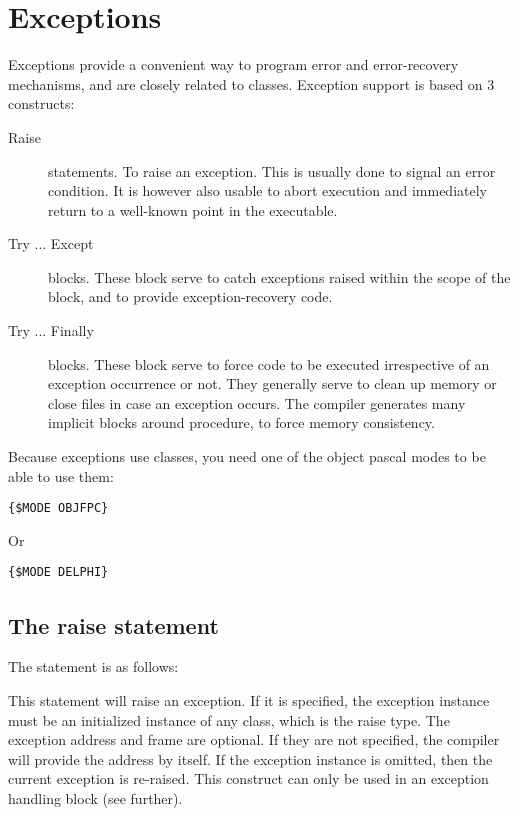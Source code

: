 \chapter{Exceptions}
\label{ch:Exceptions}
Exceptions provide a convenient way to program error and error-recovery
mechanisms, and are closely related to classes.
Exception support is based on 3 constructs:
\begin{description}
\item [Raise\ ] statements. To raise an exception. This is usually done to signal an
error condition. It is however also usable to
abort execution and immediately return to a well-known point in the
executable.
\item [Try ... Except\ ] blocks. These block serve to catch exceptions
raised within the scope of the block, and to provide exception-recovery
code.
\item [Try ... Finally\ ] blocks. These block serve to force code to be
executed irrespective of an exception occurrence or not. They generally
serve to clean up memory or close files in case an exception occurs.
The compiler generates many implicit  blocks around
procedure, to force memory consistency.
\end{description}

\begin{remark}
Because exceptions use classes, you need one of the object pascal modes to
be able to use them:
\begin{verbatim}
{$MODE OBJFPC}
\end{verbatim}
Or
\begin{verbatim}
{$MODE DELPHI}
\end{verbatim}
\end{remark}
\section{The raise statement}
The  statement is as follows:

This statement will raise an exception. If it is specified, the exception
instance must be an initialized instance of any class, which is the raise
type. The exception address and frame are optional. If they are not specified, 
the compiler will provide the address by itself. If the exception instance is omitted, 
then the current exception is re-raised. This construct can only be used 
in an exception handling block (see further).

